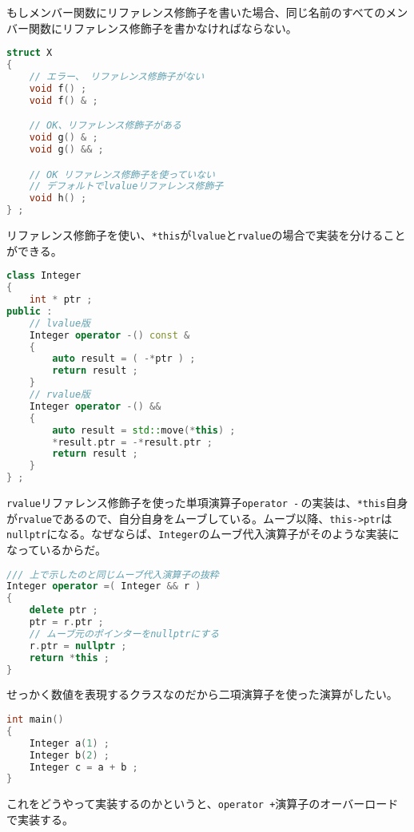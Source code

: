 もしメンバー関数にリファレンス修飾子を書いた場合、同じ名前のすべてのメンバー関数にリファレンス修飾子を書かなければならない。

\begin{lstlisting}[language={C++}]
struct X
{
    // エラー、 リファレンス修飾子がない
    void f() ;
    void f() & ;

    // OK、リファレンス修飾子がある
    void g() & ;
    void g() && ;

    // OK リファレンス修飾子を使っていない
    // デフォルトでlvalueリファレンス修飾子
    void h() ;
} ;
\end{lstlisting}

リファレンス修飾子を使い、\texttt{*this}が\texttt{lvalue}と\texttt{rvalue}の場合で実装を分けることができる。

\begin{lstlisting}[language={C++}]
class Integer
{
    int * ptr ;
public :
    // lvalue版
    Integer operator -() const &
    {
        auto result = ( -*ptr ) ;
        return result ;
    }
    // rvalue版
    Integer operator -() &&
    {
        auto result = std::move(*this) ;
        *result.ptr = -*result.ptr ;
        return result ;
    }
} ;
\end{lstlisting}

\texttt{rvalue}リファレンス修飾子を使った単項演算子\texttt{operator -}\,の実装は、\texttt{*this}自身が\texttt{rvalue}であるので、自分自身をムーブしている。ムーブ以降、\texttt{this->ptr}は\texttt{nullptr}になる。なぜならば、\texttt{Integer}のムーブ代入演算子がそのような実装になっているからだ。

\begin{lstlisting}[language={C++}]
/// 上で示したのと同じムーブ代入演算子の抜粋
Integer operator =( Integer && r )
{
    delete ptr ;
    ptr = r.ptr ;
    // ムーブ元のポインターをnullptrにする
    r.ptr = nullptr ;
    return *this ;
}
\end{lstlisting}


せっかく数値を表現するクラスなのだから二項演算子を使った演算がしたい。

\begin{lstlisting}[language={C++}]
int main()
{
    Integer a(1) ;
    Integer b(2) ;
    Integer c = a + b ;
}
\end{lstlisting}

これをどうやって実装するのかというと、\texttt{operator +}演算子のオーバーロードで実装する。

